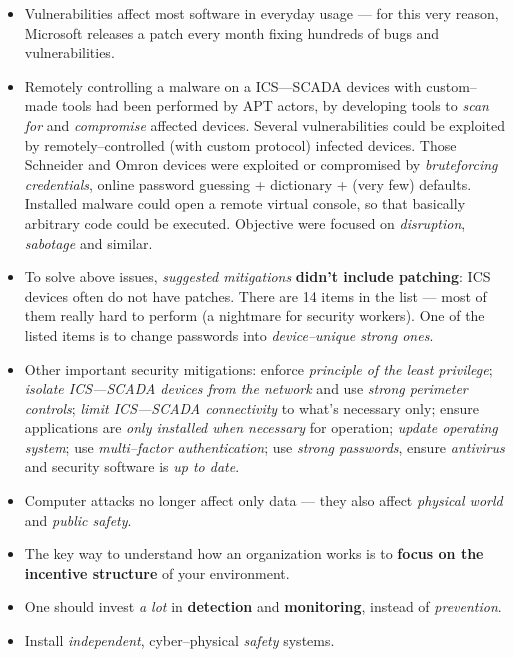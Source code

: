 \documentclass[10pt]{extreport}
\begin{document}
\begin{itemize}
    \item Vulnerabilities affect most software in everyday usage --- for this
        very reason, Microsoft releases a patch every month fixing hundreds of
        bugs and vulnerabilities.
    \item Remotely controlling a malware on a ICS---SCADA devices with
        custom--made tools had been performed by APT actors, by developing
        tools to \emph{scan for} and \emph{compromise} affected devices.
        Several vulnerabilities could be exploited by remotely--controlled
        (with custom protocol) infected devices. Those Schneider and Omron
        devices were exploited or compromised by \emph{bruteforcing
        credentials}, online password guessing + dictionary + (very few)
        defaults. Installed malware could open a remote virtual console, so
        that basically arbitrary code could be executed. Objective were focused
        on \emph{disruption}, \emph{sabotage} and similar.
    \item To solve above issues, \emph{suggested mitigations} \textbf{didn't
        include patching}: ICS devices often do not have patches. There are 14
        items in the list --- most of them really hard to perform (a nightmare
        for security workers). One of the listed items is to change passwords
        into \emph{device--unique strong ones}.
    \item Other important security mitigations: enforce \emph{principle of
        the least privilege}; \emph{isolate ICS---SCADA devices from the
        network} and use \emph{strong perimeter controls}; \emph{limit
        ICS---SCADA connectivity} to what's necessary only; ensure applications
        are \emph{only installed when necessary} for operation; \emph{update
        operating system}; use \emph{multi--factor authentication}; use
        \emph{strong passwords}, ensure \emph{antivirus} and security software
        is \emph{up to date}.
    \item Computer attacks no longer affect only data --- they also affect
        \emph{physical world} and \emph{public safety}.
    \item The key way to understand how an organization works is to
        \textbf{focus on the incentive structure} of your environment.
    \item One should invest \emph{a lot} in \textbf{detection} and
        \textbf{monitoring}, instead of \emph{prevention}.
    \item Install \emph{independent}, cyber--physical \emph{safety} systems.

\end{itemize}
\end{document}
